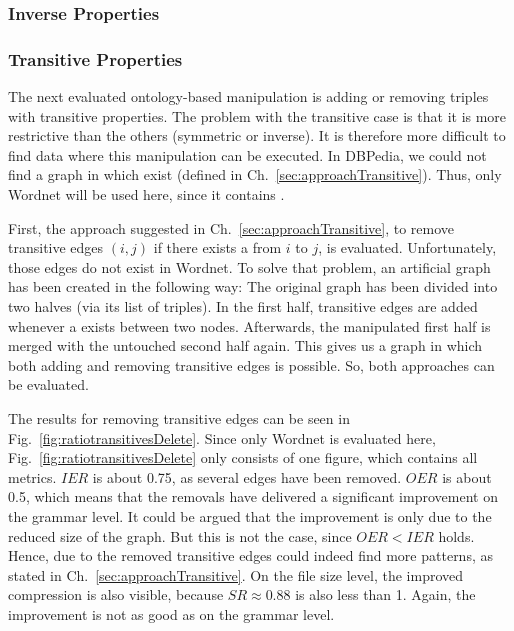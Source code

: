 \subsubsection{Inverse Properties}

\subsubsection{Transitive Properties}

The next evaluated ontology-based manipulation is adding or removing triples with transitive properties. The problem with the transitive case is that it is more restrictive than the others (symmetric or inverse). It is therefore more difficult to find data where this manipulation can be executed. In DBPedia, we could not find a graph in which \tps exist (defined in Ch.~\ref{sec:approachTransitive}). Thus, only Wordnet will be used here, since it contains \tps.

First, the approach suggested in Ch.~\ref{sec:approachTransitive}, to remove transitive edges $(i,j)$ if there exists a \tp from $i$ to $j$, is evaluated. Unfortunately, those edges do not exist in Wordnet. To solve that problem, an artificial graph has been created in the following way:  The original graph has been divided into two halves (via its list of triples). In the first half, transitive edges are added whenever a \tp exists between two nodes. Afterwards, the manipulated first half is merged with the untouched second half again. This gives us a graph in which both adding and removing transitive edges is possible. So, both approaches can be evaluated.

The results for removing transitive edges can be seen in Fig.~\ref{fig:ratiotransitivesDelete}. Since only Wordnet is evaluated here, Fig.~\ref{fig:ratiotransitivesDelete} only consists of one figure, which contains all metrics. $IER$ is about 0.75, as several edges have been removed. $OER$ is about 0.5, which means that the removals have delivered a significant improvement on the grammar level. It could be argued that the improvement is only due to the reduced size of the graph. But this is not the case, since $OER<IER$ holds. Hence, due to the removed transitive edges could indeed find more patterns, as stated in Ch.~\ref{sec:approachTransitive}. On the file size level, the improved compression is also visible, because $SR\approx0.88$ is also less than 1. Again, the improvement is not as good as on the grammar level.

